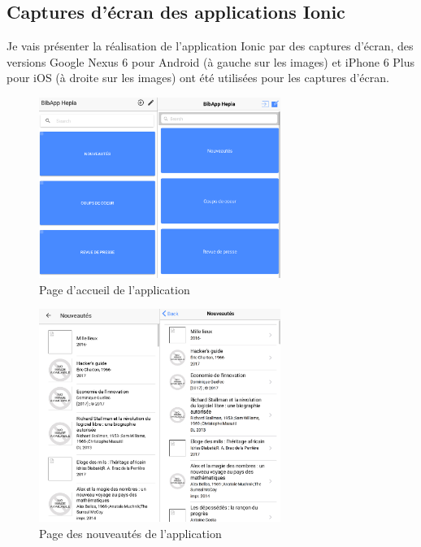 \documentclass[a4paper, 12pt]{article}
\begin{document}
\subsection{Captures d'écran des applications Ionic}
Je vais présenter la réalisation de l'application Ionic par des captures d'écran, des versions Google Nexus 6
pour Android (à gauche sur les images) et iPhone 6 Plus pour iOS (à droite sur les images) ont été utilisées pour les
captures d'écran.
\begin{figure}
    \begin{center}
        \includegraphics[width=0.7\textwidth]{images/screenshots/android_iphone_1.png}
    \end{center}
    \caption{Page d'accueil de l'application}
\end{figure}
\begin{figure}
    \begin{center}
        \includegraphics[width=0.7\textwidth]{images/screenshots/android_iphone_2.png}
    \end{center}
    \caption{Page des nouveautés de l'application}
\end{figure}
\end{document}

